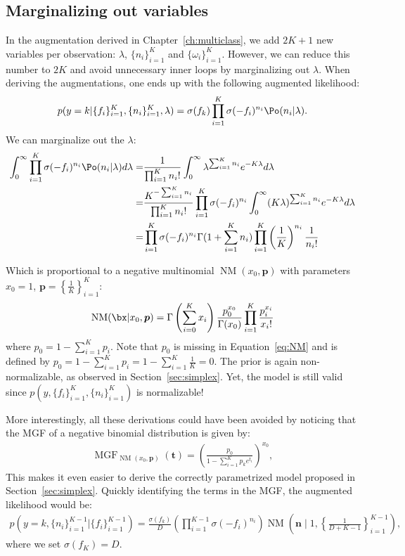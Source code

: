 \subsection{Marginalizing out variables}
\label{sec:marg_multiclass}
In the augmentation derived in Chapter~\ref{ch:multiclass}, we add $2K + 1$ new variables per observation: $\lambda$, $\{n_i\}_{i=1}^K$ and $\{\omega_i\}_{i=1}^K$.
However, we can reduce this number to $2K$ and avoid unnecessary inner loops by marginalizing out $\lambda$.
When deriving the augmentations, one ends up with the following augmented likelihood:
\begin{align}
    p(y=k|\{f_i\}_{i=1}^K,\{n_i\}_{i=1}^K,\lambda) = \sigma(f_k) \prod_{i=1}^K \sigma(-f_i)^{n_i} \Po (n_i|\lambda).
\end{align}
We can marginalize out the $\lambda$:
\begin{align}
    \int_{0}^\infty \prod_{i=1}^K \sigma(-f_i)^{n_i} \Po (n_i|\lambda)d\lambda =& \frac{1}{\prod_{i=1}^K n_i!}\int_{0}^\infty \lambda^{\sum_{i=1}^K n_i}e^{-K\lambda}d\lambda \nonumber\\
    =& \frac{K^{-\sum_{i=1}^K n_i}}{\prod_{i=1}^K n_i!}\prod_{i=1}^K \sigma(-f_i)^{n_i} \int_{0}^\infty (K\lambda)^{\sum_{i=1}^K n_i}e^{-K\lambda}d\lambda \nonumber\\
    =& \prod_{i=1}^K\sigma(-f_i)^{n_i}\Gamma(1 + \sum_{i=1}^K n_i) \prod_{i=1}^K \left(\frac{1}{K}\right)^{n_i}\frac{1}{n_i!} \label{eq:NM}
\end{align}

Which is proportional to a negative multinomial $\operatorname{NM}(x_0, \boldsymbol{p})$ with parameters $x_0=1$, $\boldsymbol{p}=\left\{\frac{1}{K}\right\}_{i=1}^K$:
\begin{align*}
    \operatorname{NM}(\bx|x_0,\boldsymbol{p}) = \Gamma\left(\sum_{i=0}^K x_i\right) \frac{p_0^{x_0}}{\Gamma(x_0)}\prod_{i=1}^K \frac{p_i^{x_i}}{x_i!}   
\end{align*}
where $p_0 = 1 - \sum_{i=1}^K p_i$.
Note that $p_0$ is missing in Equation~\ref{eq:NM} and is defined by $p_0= 1 - \sum_{i=1}^K p_i = 1 - \sum_{i=1}^{K}\frac{1}{K} = 0$.
The prior is again non-normalizable, as observed in Section~\ref{sec:simplex}.
Yet, the model is still valid since $p(y,\{f_i\}_{i=1}^K,\{n_i\}_{i=1}^K)$ is normalizable!

More interestingly, all these derivations could have been avoided by noticing that the \ac{MGF} of a negative binomial distribution is given by:
\begin{align*}
    \operatorname{MGF}_{\operatorname{NM}(x_0,\boldsymbol{p})}(\boldsymbol{t}) = \left(\frac{p_0}{1-\sum_{i=1}^K p_k e^{t_i}}\right)^{x_0},
\end{align*}
This makes it even easier to derive the correctly parametrized model proposed in Section~\ref{sec:simplex}.
Quickly identifying the terms in the \ac{MGF}, the augmented likelihood would be:
\begin{align*}
    p\left(y=k,\{n_i\}_{i=1}^{K-1}|\{f_i\}_{i=1}^{K-1}\right) = \frac{\sigma(f_k)}{D}\left(\prod_{i=1}^{K-1}\sigma(-f_i)^{n_i}\right)\operatorname{NM}\left(\boldsymbol{n}\mid 1, \left\{\frac{1}{D+K-1}\right\}_{i=1}^{K-1}\right),
\end{align*}
where we set $\sigma(f_K) = D$.

